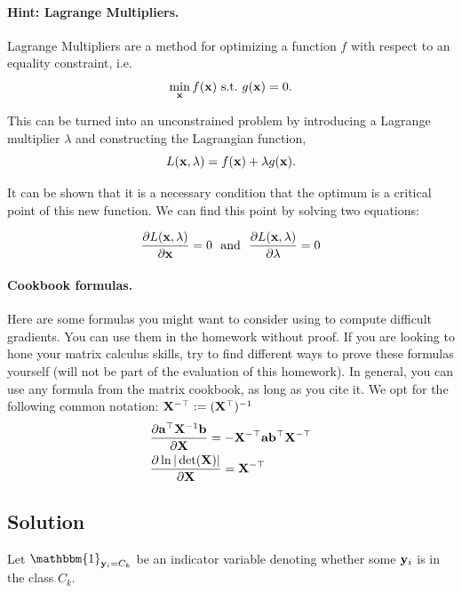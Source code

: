\documentclass[submit]{harvardml}
\begin{document}
\begin{problem}
\paragraph{Hint: Lagrange Multipliers.} Lagrange Multipliers are a method for
optimizing a function $f$ with respect to an
equality constraint, i.e.
\[\min_{\mathbf{x}} f(\mathbf{x})\ \text{s.t.}\ g(\mathbf{x}) = 0.\]

This can be turned into an unconstrained problem by introducing a
Lagrange multiplier $\lambda$ and constructing the Lagrangian function,
\[L(\mathbf{x}, \lambda) =  f(\mathbf{x}) + \lambda g(\mathbf{x}).\]

It can be shown that it is a necessary condition that the optimum
is a critical point of this new function. We can find this point by solving two equations:

\[\frac{\partial L(\mathbf{x}, \lambda)}{\partial  \mathbf{x}} = 0  \ \ \text{and}\  \  \frac{\partial L(\mathbf{x}, \lambda)}{\partial \lambda} = 0 \]


\paragraph{Cookbook formulas.} Here are some formulas you might want to consider
using to compute difficult gradients. You can use them  in the homework
without proof. If you are looking to hone your matrix calculus skills, try to
find different ways to prove these formulas yourself (will not be part of the
evaluation of this homework). In general, you can use any formula from the matrix cookbook,
as long as you cite it. We opt for the following common notation:
$\mathbf{X}^{-\top} := (\mathbf{X}^{\top})^{-1}$
\begin{align*}
  & \frac{\partial \mathbf{a}^\top \mathbf{X}^{-1} \mathbf{b}}{\partial \mathbf{X}} = - \mathbf{X}^{-\top} \mathbf{a} \mathbf{b}^\top \mathbf{X}^{-\top} \\
  & \frac{\partial \ln | \det (\mathbf{X}) |}{\partial \mathbf{X}} = \mathbf{X}^{-\top}
 \end{align*}
 \end{problem}


\subsection*{Solution}
            \newcommand{\yickindicator}{\mathbbm{1}_{\bold y_i = C_k}}
            

            Let $\yickindicator$ be an indicator variable denoting whether some $\bold y_i$ is in the class $C_k$.
\end{document}
